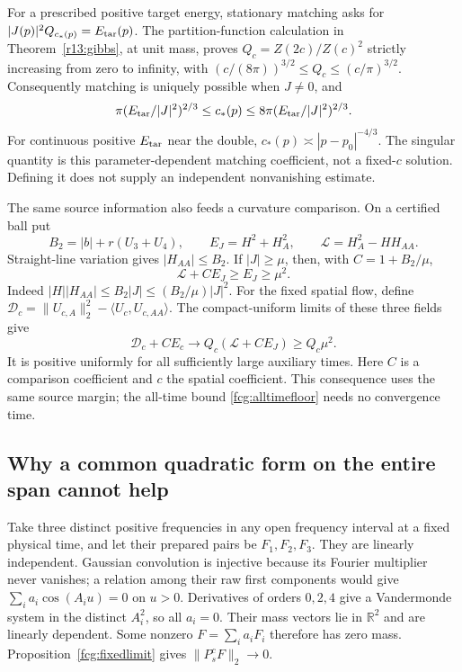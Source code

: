\documentclass[11pt]{article}
\numberwithin{equation}{section}
\newcommand{\R}{\mathbb R}
\begin{document}
For a prescribed positive target energy, stationary matching asks for
$|J(p)|^2Q_{c_*(p)}=E_{\rm tar}(p)$.
The partition-function calculation in Theorem~\ref{r13:gibbs}, at
unit mass, proves $Q_c=Z(2c)/Z(c)^2$ strictly increasing from zero to
infinity, with
$(c/(8\pi))^{3/2}\le Q_c\le(c/\pi)^{3/2}$.
Consequently matching is uniquely possible when $J\ne0$, and
\[
 \pi(E_{\rm tar}/|J|^2)^{2/3}
 \le c_*(p)\le8\pi(E_{\rm tar}/|J|^2)^{2/3}.
\]
For continuous positive $E_{\rm tar}$ near the double,
$c_*(p)\asymp|p-p_0|^{-4/3}$. The singular quantity is this
parameter-dependent matching coefficient, not a fixed-$c$ solution.
Defining it does not supply an independent nonvanishing estimate.

The same source information also feeds a curvature comparison.
On a certified ball put
\[
 B_2=|b|+r(U_3+U_4),\qquad
 E_J=H^2+H_A^2,\qquad \mathcal L=H_A^2-HH_{AA}.
\]
Straight-line variation gives $|H_{AA}|\le B_2$. If $|J|\ge\mu$,
then, with $C=1+B_2/\mu$,
\begin{equation}\label{fcg:curvaturecomparison}
 \mathcal L+CE_J\ge E_J\ge\mu^2.
\end{equation}
Indeed $|H||H_{AA}|\le B_2|J|\le(B_2/\mu)|J|^2$.
For the fixed spatial flow, define
$\mathcal D_c=\|U_{c,A}\|_2^2-\langle U_c,U_{c,AA}\rangle$.
The compact-uniform limits of these three fields give
\[
 \mathcal D_c+CE_c\longrightarrow Q_c(\mathcal L+CE_J)
                                      \ge Q_c\mu^2.
\]
It is positive uniformly for all sufficiently large auxiliary times.
Here $C$ is a comparison coefficient and $c$ the spatial coefficient.
This consequence uses the same source margin; the all-time bound
\eqref{fcg:alltimefloor} needs no convergence time.

\subsection{Why a common quadratic form on the entire span cannot help}

Take three distinct positive frequencies in any open frequency interval
at a fixed physical time, and let their prepared pairs be $F_1,F_2,F_3$.
They are linearly independent. Gaussian convolution is injective
because its Fourier multiplier never vanishes; a relation among their
raw first components would give
$\sum_i a_i\cos(A_i u)=0$ on $u>0$. Derivatives of orders $0,2,4$
give a Vandermonde system in the distinct $A_i^2$, so all $a_i=0$.
Their mass vectors lie in $\R^2$ and are linearly dependent.
Some nonzero $F=\sum_i a_iF_i$ therefore has zero mass.
Proposition~\ref{fcg:fixedlimit} gives $\|P_s^cF\|_2\to0$.
\end{document}
